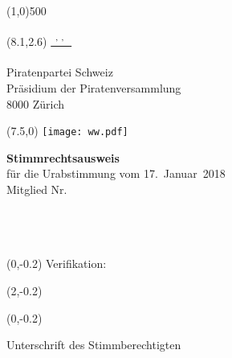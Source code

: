 \documentclass[11pt, a4paper]{scrartcl}
\begin{document}
{\begin{minipage}[t][13.42cm][t]{\textwidth}
\end{minipage}

\line(1,0){500}
\vspace{1cm}

\begin{minipage}[t][12.5cm][t]{\textwidth}

\begin{textblock}{9}(8.1,2.6)
\underline{\textsuperscript*{ \givenname~\surname, \street, \postalcode~\location }} \\
\vspace{-0.3cm} \\
Piratenpartei Schweiz \\
Präsidium der Piratenversammlung \\
8000 Zürich
\end{textblock}

\begin{textblock}{6}(7.5,0)
\texttt{[image: ww.pdf]}
\end{textblock}

{\LARGE\textbf{Stimmrechtsausweis}} \\
für die Urabstimmung vom 17.~Januar~2018 \\

Mitglied Nr. \textbf{\id}   \\
\givenname~\surname         \\
\street                     \\
\postalcode~\location       \\
%

\begin{textblock}{6}(0,-0.2)
Verifikation:
\end{textblock}

\begin{textblock}{4}(2,-0.2)
\raggedright
\code
\end{textblock}

\vspace{4cm}

\begin{textblock}{6}(0,-0.2)
\begin{framed}
Unterschrift des Stimmberechtigten \\
\vspace{1.5cm} ~ \\
\end{framed}
\end{textblock}


\end{minipage}}
\end{document}
